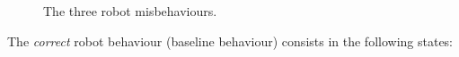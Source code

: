 \documentclass{sig-alternate}
\begin{document}
\begin{figure}[!t]
    \centering
    \caption{\small The three robot misbehaviours.}
    \label{fig:domino-misbehaviour}
\end{figure}

The \emph{correct} robot behaviour (baseline behaviour) consists in the
following states:
\end{document}
